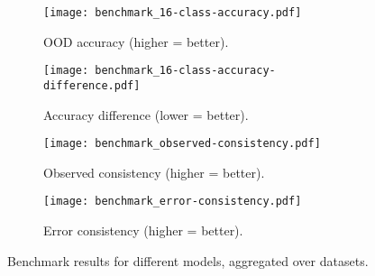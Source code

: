 \begin{figure}[h]
	\begin{subfigure}{0.49\linewidth}
		\centering
		\texttt{[image: benchmark\_16-class-accuracy.pdf]}
		\caption{OOD accuracy (higher = better).}
		\label{subfig:benchmark_a}
		\vspace{\captionspaceII}
	\end{subfigure}\hfill
	\begin{subfigure}{0.49\linewidth}
		\centering
		\texttt{[image: benchmark\_16-class-accuracy-difference.pdf]}
		\caption{Accuracy difference (lower = better).}
		\label{subfig:benchmark_b}
		\vspace{\captionspaceII}
	\end{subfigure}\hfill
	\begin{subfigure}{0.49\linewidth}
		\centering
		\texttt{[image: benchmark\_observed-consistency.pdf]}
		\caption{Observed consistency (higher = better).}			\label{subfig:benchmark_c}
		\vspace{\captionspaceII}
	\end{subfigure}\hfill
	\begin{subfigure}{0.49\linewidth}
		\centering
		\texttt{[image: benchmark\_error-consistency.pdf]}
		\caption{Error consistency (higher = better).}			\label{subfig:benchmark_d}
		\vspace{\captionspaceII}
	\end{subfigure}\hfill
	\caption{Benchmark results for different models, aggregated over datasets.}
	\label{fig:benchmark_barplots}
\end{figure}
